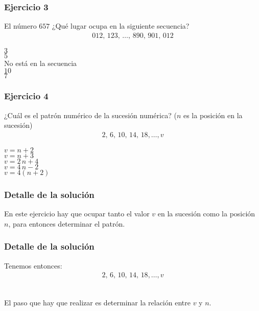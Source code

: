 \begin{frame}
\frametitle{Ejercicio 3}
El número $657$ ¿Qué lugar ocupa en la siguiente secuencia?
\begin{align*}
012, \, 123, \, \ldots, \, 890, \, 901, \, 012
\end{align*}
\begin{choices}
\choice $3$ \\
\choice $5$ \\
\choice No está en la secuencia \\
\choice $10$ \\
\choice $7$
\end{choices}
\pause
{}
\end{frame}
\begin{frame}
\frametitle{Ejercicio 4}
¿Cuál es el patrón numérico de la sucesión numérica? ($n$ es la posición en la sucesión)
\begin{align*}
2, \, 6, \, 10, \, 14, \, 18, \ldots, v
\end{align*}
\begin{choices}
\choice $v = n + 2$ \\
\choice $v = n + 3$ \\
\choice $v = 2 \, n + 4$ \\
\choice $v = 4 \, n - 2$ \\
\choice $v = 4(n + 2)$
\end{choices}
\pause
{}
\end{frame}
\begin{frame}
\frametitle{Detalle de la solución}
En este ejercicio hay que ocupar tanto el valor $v$ en la sucesión como la posición $n$, para entonces determinar el patrón.
\end{frame}
\begin{frame}
\frametitle{Detalle de la solución}
Tenemos entonces:
\pause
\begin{align*}
2, \, 6, \, 10, \, 14, \, 18, \ldots, v
\end{align*}
\pause
\\
\bigskip
El paso que hay que realizar es determinar la relación entre $v$ y $n$.
\end{frame}
